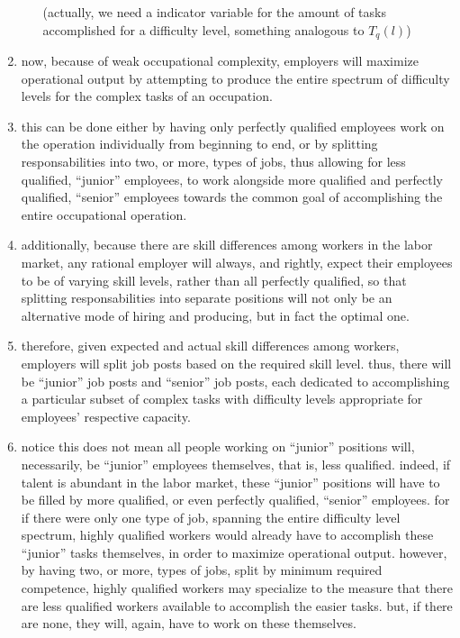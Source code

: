 \documentclass[hidelinks, nonatbib]{elsarticle}
\begin{document}
\begin{enumerate}
\begin{enumerate}
        (actually, we need a indicator variable for the amount of tasks accomplished for a difficulty level, something analogous to $T_q(l)$)
    \end{enumerate}
    \item now, because of weak occupational complexity, employers will maximize operational output by attempting to produce the entire spectrum of difficulty levels for the complex tasks of an occupation.
    \item this can be done either by having only perfectly qualified employees work on the operation individually from beginning to end, or by splitting responsabilities into two, or more, types of jobs, thus allowing for less qualified, ``junior'' employees, to work alongside more qualified and perfectly qualified, ``senior'' employees towards the common goal of accomplishing the entire occupational operation.
    \item additionally, because there are skill differences among workers in the labor market, any rational employer will always, and rightly, expect their employees to be of varying skill levels, rather than all perfectly qualified, so that splitting responsabilities into separate positions will not only be an alternative mode of hiring and producing, but in fact the optimal one.
    \item therefore, given expected and actual skill differences among workers, employers will split job posts based on the required skill level. thus, there will be ``junior'' job posts and ``senior'' job posts, each dedicated to accomplishing a particular subset of complex tasks with difficulty levels appropriate for employees' respective capacity.
    \item notice this does not mean all people working on ``junior'' positions will, necessarily, be ``junior'' employees themselves, that is, less qualified. indeed, if talent is abundant in the labor market, these ``junior'' positions will have to be filled by more qualified, or even perfectly qualified, ``senior'' employees. for if there were only one type of job, spanning the entire difficulty level spectrum, highly qualified workers would already have to accomplish these ``junior'' tasks themselves, in order to maximize operational output. however, by having two, or more, types of jobs, split by minimum required competence, highly qualified workers may specialize to the measure that there are less qualified workers available to accomplish the easier tasks. but, if there are none, they will, again, have to work on these themselves.

\end{enumerate}
\end{document}
